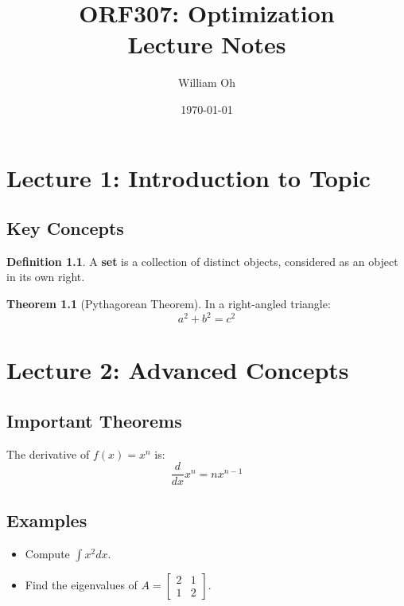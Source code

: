 \documentclass[a4paper,12pt]{report}
\title{\textbf{ORF307: Optimization \\ Lecture Notes}}
\author{William Oh}
\date{\today}
\theoremstyle{definition}
\newtheorem{definition}{Definition}[section]
\newtheorem{theorem}{Theorem}[section]
\begin{document}
\maketitle
\tableofcontents %

\chapter{Lecture 1: Introduction to Topic}
\section{Key Concepts}
\begin{definition}
    A \textbf{set} is a collection of distinct objects, considered as an object in its own right.
\end{definition}

\begin{theorem}[Pythagorean Theorem]
    In a right-angled triangle:
    \[
    a^2 + b^2 = c^2
    \]
\end{theorem}

\chapter{Lecture 2: Advanced Concepts}
\section{Important Theorems}
\begin{summarybox}
    The derivative of \( f(x) = x^n \) is:
    \[
    \frac{d}{dx} x^n = n x^{n-1}
    \]
\end{summarybox}

\section{Examples}
\begin{itemize}
    \item Compute \( \int x^2 dx \).
    \item Find the eigenvalues of \( A = \begin{bmatrix} 2 & 1 \\ 1 & 2 \end{bmatrix} \).
\end{itemize}
\end{document}
